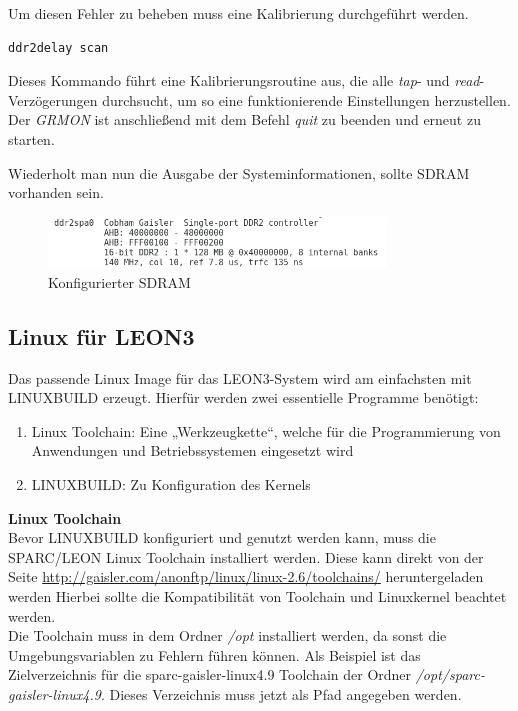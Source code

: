Um diesen Fehler zu beheben muss eine Kalibrierung durchgeführt werden.\\

\begin{lstlisting}[caption={Starten der Routine},label={code:ddr2delay}]
ddr2delay scan
   \end{lstlisting}


Dieses Kommando führt eine Kalibrierungsroutine aus, die alle \emph{tap}- und \emph{read}-Verzögerungen durchsucht, um so eine funktionierende Einstellungen herzustellen.\\

Der \emph{GRMON} ist anschließend mit dem Befehl \emph{quit} zu beenden und erneut zu starten.

Wiederholt man nun die Ausgabe der Systeminformationen, sollte SDRAM vorhanden sein.

\begin{figure}[H]
\centering
\includegraphics[width=0.8\textwidth]{Hauptteil/sdram.png}
\caption{Konfigurierter SDRAM}
\label{fig:sdram}
\end{figure}


\newpage
\subsection{Linux für LEON3}\label{kap:linuxleon}

Das passende Linux Image für das LEON3-System wird am einfachsten mit LINUXBUILD erzeugt. Hierfür werden zwei essentielle Programme benötigt:
\begin{enumerate}
  \item Linux Toolchain: Eine „Werkzeugkette“, welche für die Programmierung von Anwendungen und Betriebssystemen eingesetzt wird
  \item LINUXBUILD: Zu Konfiguration des Kernels
\end{enumerate}

\vspace{2mm}

\textbf{Linux Toolchain}\\

Bevor LINUXBUILD konfiguriert und genutzt werden kann, muss die SPARC/LEON Linux Toolchain installiert werden.
Diese kann direkt von der Seite \url{ http://gaisler.com/anonftp/linux/linux-2.6/toolchains/} heruntergeladen werden Hierbei sollte die Kompatibilität von Toolchain und Linuxkernel beachtet werden.\\
Die Toolchain muss in dem Ordner \emph{/opt} installiert werden, da sonst die Umgebungsvariablen zu Fehlern führen können. Als Beispiel ist das Zielverzeichnis für die sparc-gaisler-linux4.9 Toolchain der Ordner \emph{/opt/sparc-gaisler-linux4.9}.
Dieses Verzeichnis muss jetzt als Pfad angegeben werden.\\

